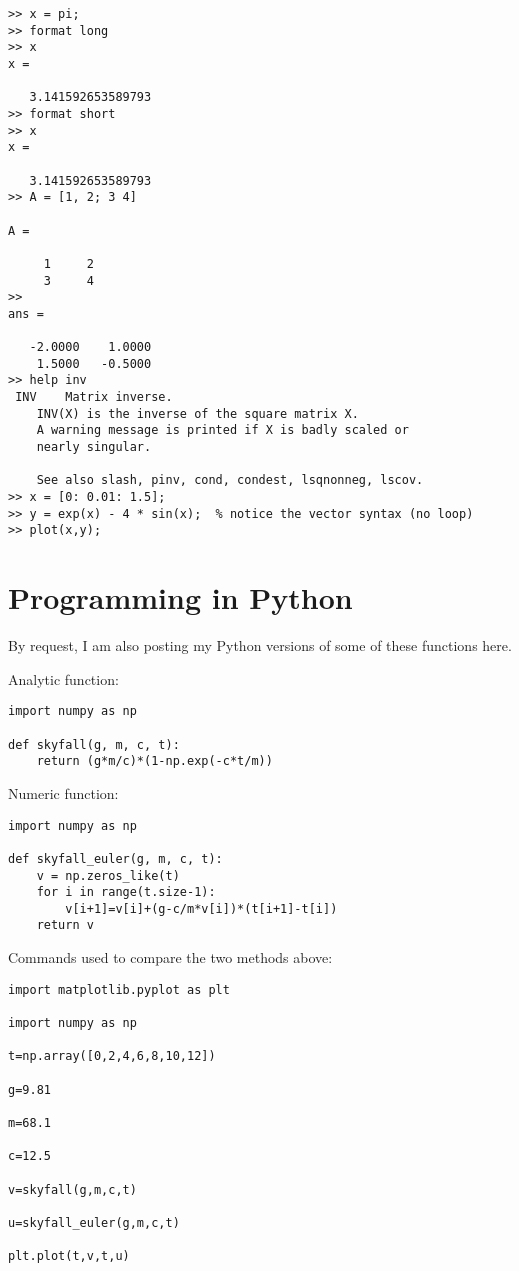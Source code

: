 \documentclass [titlepage,12pt,letter] {article}
\begin{document}
\begin{verbatim} 
>> x = pi; 
>> format long 
>> x 
x =

   3.141592653589793
>> format short 
>> x 
x =

   3.141592653589793
>> A = [1, 2; 3 4]

A =

     1     2
     3     4
>>
ans =

   -2.0000    1.0000
    1.5000   -0.5000
>> help inv  
 INV    Matrix inverse.
    INV(X) is the inverse of the square matrix X.
    A warning message is printed if X is badly scaled or
    nearly singular.
 
    See also slash, pinv, cond, condest, lsqnonneg, lscov.
>> x = [0: 0.01: 1.5];
>> y = exp(x) - 4 * sin(x);  % notice the vector syntax (no loop)
>> plot(x,y);
\end{verbatim} 

\section{Programming in Python}
By request, I am also posting my Python versions of some of these functions here.

Analytic function:
\begin{verbatim}
import numpy as np

def skyfall(g, m, c, t):
    return (g*m/c)*(1-np.exp(-c*t/m))
\end{verbatim}

Numeric function:
\begin{verbatim}
import numpy as np

def skyfall_euler(g, m, c, t):
    v = np.zeros_like(t)
    for i in range(t.size-1):
        v[i+1]=v[i]+(g-c/m*v[i])*(t[i+1]-t[i])
    return v
\end{verbatim}

Commands used to compare the two methods above:
\begin{verbatim}
import matplotlib.pyplot as plt

import numpy as np

t=np.array([0,2,4,6,8,10,12])

g=9.81

m=68.1

c=12.5

v=skyfall(g,m,c,t)

u=skyfall_euler(g,m,c,t)

plt.plot(t,v,t,u)
\end{verbatim}
\end{document}
